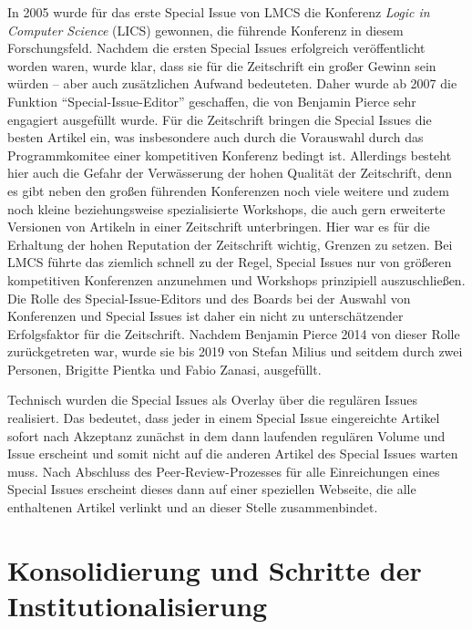 \documentclass[a4paper,
fontsize=11pt,
oneside,
numbers=noperiodatend,
parskip=half-,
bibliography=totoc,
final
]{scrartcl}
\begin{document}
In 2005 wurde für das erste Special Issue von LMCS die Konferenz
\emph{Logic in Computer Science} (LICS) gewonnen, die führende Konferenz
in diesem Forschungsfeld. Nachdem die ersten Special Issues erfolgreich
veröffentlicht worden waren, wurde klar, dass sie für die Zeitschrift
ein großer Gewinn sein würden -- aber auch zusätzlichen Aufwand
bedeuteten. Daher wurde ab 2007 die Funktion
\enquote{Special-Issue-Editor} geschaffen, die von Benjamin Pierce sehr
engagiert ausgefüllt wurde. Für die Zeitschrift bringen die Special
Issues die besten Artikel ein, was insbesondere auch durch die
Vorauswahl durch das Programmkomitee einer kompetitiven Konferenz
bedingt ist. Allerdings besteht hier auch die Gefahr der Verwässerung
der hohen Qualität der Zeitschrift, denn es gibt neben den großen
führenden Konferenzen noch viele weitere und zudem noch kleine
beziehungsweise spezialisierte Workshops, die auch gern erweiterte
Versionen von Artikeln in einer Zeitschrift unterbringen. Hier war es
für die Erhaltung der hohen Reputation der Zeitschrift wichtig, Grenzen
zu setzen. Bei LMCS führte das ziemlich schnell zu der Regel, Special
Issues nur von größeren kompetitiven Konferenzen anzunehmen und
Workshops prinzipiell auszuschließen. Die Rolle des
Special-Issue-Editors und des Boards bei der Auswahl von Konferenzen und
Special Issues ist daher ein nicht zu unterschätzender Erfolgsfaktor für
die Zeitschrift. Nachdem Benjamin Pierce 2014 von dieser Rolle
zurückgetreten war, wurde sie bis 2019 von Stefan Milius und seitdem
durch zwei Personen, Brigitte Pientka und Fabio Zanasi, ausgefüllt.

Technisch wurden die Special Issues als Overlay über die regulären
Issues realisiert. Das bedeutet, dass jeder in einem Special Issue
eingereichte Artikel sofort nach Akzeptanz zunächst in dem dann
laufenden regulären Volume und Issue erscheint und somit nicht auf die
anderen Artikel des Special Issues warten muss. Nach Abschluss des
Peer-Review-Prozesses für alle Einreichungen eines Special Issues
erscheint dieses dann auf einer speziellen Webseite, die alle
enthaltenen Artikel verlinkt und an dieser Stelle zusammenbindet.

\hypertarget{konsolidierung-und-schritte-der-institutionalisierung}{%
\section{Konsolidierung und Schritte der
Institutionalisierung}\label{konsolidierung-und-schritte-der-institutionalisierung}}
\end{document}
